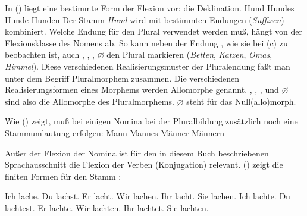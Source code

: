 In () liegt eine bestimmte Form der Flexion vor: die Deklination.
\eal
\ex Hund\label{bsp-hund-nom}
\ex Hundes\label{bsp-hund-gen}
\ex Hunde
\ex Hunden
\zl
Der Stamm \emph{Hund} wird mit bestimmten Endungen (\emph{Suffixen})
kombiniert. Welche Endung für den Plural verwendet werden muß, hängt von der Flexionsklasse
des Nomens ab. So kann neben der Endung , wie sie bei (c) zu beobachten ist, auch
, , , $\varnothing$ den Plural markieren (\emph{Betten},
\emph{Katzen}, \emph{Omas}, \emph{Himmel}). Diese verschiedenen Realisierungsmuster der Pluralendung
faßt man unter dem Begriff Pluralmorphem zusammen. Die verschiedenen Realisierungsformen eines
Morphems werden Allomorphe genannt. , , ,  und
$\varnothing$ sind also die Allomorphe des Pluralmorphems. $\varnothing$ steht für das Null(allo)morph.

Wie () zeigt, muß bei einigen Nomina bei der Pluralbildung zusätzlich noch eine Stammumlautung erfolgen:
\eal
\ex Mann\label{bsp-mann-nom}
\ex Mannes\label{bsp-mann-gen}
\ex Männer
\ex Männern
\zl


\noindent
Außer der Flexion der Nomina ist für den in diesem Buch beschriebenen Sprachausschnitt die 
Flexion der Verben (Konjugation) relevant. () zeigt die finiten Formen für
den Stamm :
\begin{multicols}{2}
\eal
\label{verb-konjugation-praesens}
\ex Ich lache.
\ex Du  lachst.
\ex Er  lacht.
\ex Wir lachen.
\ex Ihr lacht.
\ex Sie lachen.
\zl
\eal
\label{verb-konjugation-praeteritum}
\ex Ich lachte.
\ex Du  lachtest.
\ex Er  lachte.
\ex Wir lachten.
\ex Ihr lachtet.
\ex Sie lachten.
\zl
\end{multicols}

